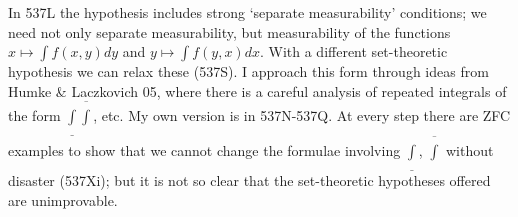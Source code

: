 {In 537L the hypothesis includes strong `separate measurability' conditions;
we need not only separate measurability, but
measurability of the functions $x\mapsto\int f(x,y)dy$ and
$y\mapsto\int f(y,x)dx$.   With a different set-theoretic hypothesis we can
relax these (537S).   I approach this form through ideas
from {\smc Humke \& Laczkovich 05}, where there is a careful analysis of
repeated integrals of the form $\underline{\int}\overline{\int}$, etc.
My own version is in 537N-537Q.   %
At every step there are ZFC examples to show that we cannot change the
formulae involving
$\underline{\int}$, $\overline{\int}$ without disaster (537Xi);
but it is not so clear that the set-theoretic hypotheses offered are
unimprovable.

}%

\discrpage

